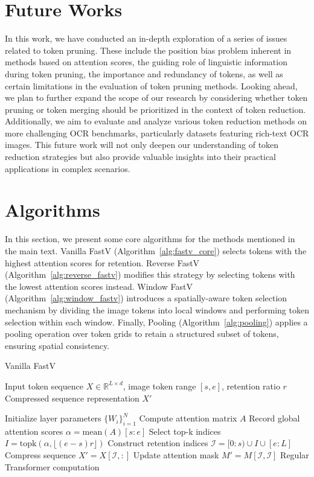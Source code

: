\section{Future Works}
In this work, we have conducted an in-depth exploration of a series of issues related to token pruning. These include the position bias problem inherent in methods based on attention scores, the guiding role of linguistic information during token pruning, the importance and redundancy of tokens, as well as certain limitations in the evaluation of token pruning methods.
Looking ahead, we plan to further expand the scope of our research by considering whether token pruning or token merging should be prioritized in the context of token reduction. Additionally, we aim to evaluate and analyze various token reduction methods on more challenging OCR benchmarks, particularly datasets featuring rich-text OCR images.
This future work will not only deepen our understanding of token reduction strategies but also provide valuable insights into their practical applications in complex scenarios.



\section{Algorithms}\label{app:algorithms}
In this section, we present some core algorithms for the methods mentioned in the main text. Vanilla FastV (Algorithm~\ref{alg:fastv_core}) selects tokens with the highest attention scores for retention. Reverse FastV (Algorithm~\ref{alg:reverse_fastv}) modifies this strategy by selecting tokens with the lowest attention scores instead. Window FastV (Algorithm~\ref{alg:window_fastv}) introduces a spatially-aware token selection mechanism by dividing the image tokens into local windows and performing token selection within each window. Finally, Pooling (Algorithm~\ref{alg:pooling}) applies a pooling operation over token grids to retain a structured subset of tokens, ensuring spatial consistency.

\begin{algorithm}[!h]
\caption{Vanilla FastV}
\label{alg:fastv_core}
\begin{algorithmic}[1]
\Require Input token sequence $X \in \mathbb{R}^{L \times d}$, image token range $[s,e]$, retention ratio $r$
\Ensure Compressed sequence representation $X'$

\State Initialize layer parameters $\{W_i\}_{i=1}^N$
        \State Compute attention matrix $A$
        \State Record global attention scores $\alpha = \text{mean}(A)[s:e]$
        \State Select top-k indices $I = \text{topk}(\alpha, \lfloor (e-s)r \rfloor)$
        \State Construct retention indices $\mathcal{I} = [0:s) \cup I \cup [e:L]$
        \State Compress sequence $X' = X[\mathcal{I},:]$
        \State Update attention mask $M' = M[\mathcal{I},\mathcal{I}]$
    \Else
        \State Regular Transformer computation
    \EndIf
\EndFor
\end{algorithmic}
\end{algorithm}


